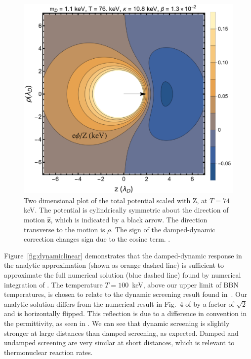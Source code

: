 \begin{figure} 
 \centerline{\includegraphics[width=.90\linewidth]{plots/chap03BBN/Pot_2DPlotFix.png}}
 \caption{Two dimensional plot of the total potential  scaled with Z, at $T=74\,$keV. The potential is cylindrically symmetric about the direction of motion $\boldsymbol{\hat{z}}$, which is indicated by a black arrow. The direction transverse to the motion is $\rho$. The sign of the damped-dynamic correction  changes sign due to the cosine term. .}
 \label{fig:numericalComp}
\end{figure} 

Figure~\ref{fig:dynamiclinear} demonstrates that the damped-dynamic response in the analytic approximation  (shown as orange dashed line) is sufficient to approximate the full numerical solution (blue dashed line) found by numerical integration of . The temperature $T = 100$\, keV, above our upper limit of BBN temperatures, is chosen to relate to the dynamic screening result found in~\cite{Hwang:2021kno}. Our analytic solution differs from the numerical result in Fig.~4 of \cite{Hwang:2021kno} by a factor of $\sqrt{2}$ and is horizontally flipped. This reflection is due to a difference in convention in the permittivity, as seen in . We can see that dynamic screening is slightly stronger at large distances than damped screening, as expected. Damped and undamped screening are very similar at short distances, which is relevant to thermonuclear reaction rates. 

